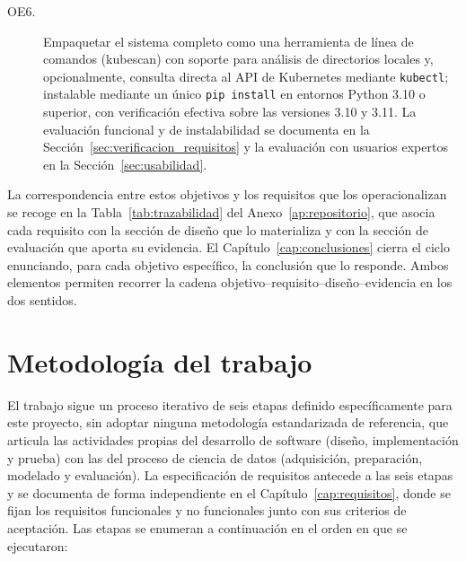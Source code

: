 \begin{description}
  \item[OE6.] Empaquetar el sistema completo como una herramienta de línea de comandos
    (kubescan) con soporte para análisis de directorios locales y,
    opcionalmente, consulta directa al \ac{API} de Kubernetes mediante
    \texttt{kubectl}; instalable mediante un único \texttt{pip install} en entornos
    Python 3.10 o superior, con verificación efectiva sobre las versiones 3.10 y
    3.11. La evaluación funcional y de instalabilidad se documenta en la
    Sección~\ref{sec:verificacion_requisitos} y la evaluación con usuarios expertos
    en la Sección~\ref{sec:usabilidad}.
\end{description}

La correspondencia entre estos objetivos y los requisitos que los operacionalizan
se recoge en la Tabla~\ref{tab:trazabilidad} del Anexo~\ref{ap:repositorio}, que
asocia cada requisito con la sección de diseño que lo materializa y con la sección
de evaluación que aporta su evidencia. El Capítulo~\ref{cap:conclusiones} cierra el
ciclo enunciando, para cada objetivo específico, la conclusión que lo responde.
Ambos elementos permiten recorrer la cadena objetivo–requisito–diseño–evidencia en
los dos sentidos.

\section{Metodología del trabajo}

El trabajo sigue un proceso iterativo de seis etapas definido específicamente para
este proyecto, sin adoptar ninguna metodología estandarizada de referencia, que
articula las actividades propias del desarrollo de software (diseño,
implementación y prueba) con las del proceso de ciencia de datos (adquisición,
preparación, modelado y evaluación). La especificación de requisitos antecede a las
seis etapas y se documenta de forma independiente en el
Capítulo~\ref{cap:requisitos}, donde se fijan los requisitos funcionales y no
funcionales junto con sus criterios de aceptación. Las etapas se enumeran a
continuación en el orden en que se ejecutaron:

